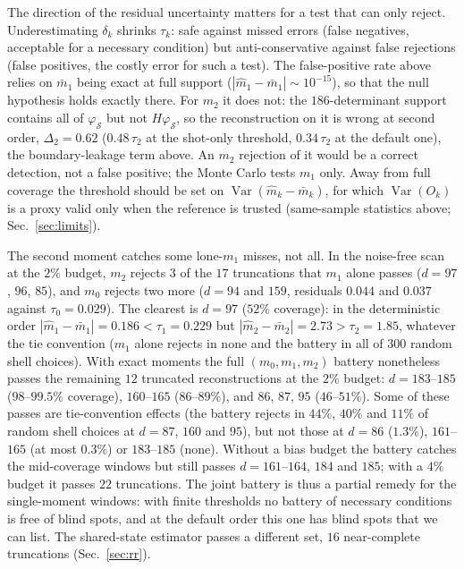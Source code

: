 \documentclass[submission, PhysCore]{SciPost}
\begin{document}
\begin{appendix}
The direction of the residual uncertainty matters for a test that can only reject. Underestimating $\delta_k$ shrinks $\tau_k$: safe against missed errors (false negatives, acceptable for a necessary condition) but anti-conservative against false rejections (false positives, the costly error for such a test). The false-positive rate above relies on $\bar m_1$ being exact at full support ($|\widehat m_1-\bar m_1|\sim10^{-15}$), so that the null hypothesis holds exactly there. For $m_2$ it does not: the $186$-determinant support contains all of $\varphi_\mathcal{S}$ but not $H\varphi_\mathcal{S}$, so the reconstruction on it is wrong at second order, $\Delta_2=0.62$ ($0.48\,\tau_2$ at the shot-only threshold, $0.34\,\tau_2$ at the default one), the boundary-leakage term above. An $m_2$ rejection of it would be a correct detection, not a false positive; the Monte Carlo tests $m_1$ only. Away from full coverage the threshold should be set on $\operatorname{Var}(\widehat m_k-\bar m_k)$, for which $\operatorname{Var}(O_k)$ is a proxy valid only when the reference is trusted (same-sample statistics above; Sec.~\ref{sec:limits}).

The second moment catches some lone-$m_1$ misses, not all. In the noise-free scan at the $2\%$ budget, $m_2$ rejects $3$ of the $17$ truncations that $m_1$ alone passes ($d=97$, $96$, $85$), and $m_0$ rejects two more ($d=94$ and $159$, residuals $0.044$ and $0.037$ against $\tau_0=0.029$). The clearest is $d=97$ ($52\%$ coverage): in the deterministic order $|\widehat m_1-\bar m_1|=0.186<\tau_1=0.229$ but $|\widehat m_2-\bar m_2|=2.73>\tau_2=1.85$, whatever the tie convention ($m_1$ alone rejects in none and the battery in all of $300$ random shell choices). With exact moments the full $(m_0,m_1,m_2)$ battery nonetheless passes the remaining $12$ truncated reconstructions at the $2\%$ budget: $d=183$--$185$ ($98$--$99.5\%$ coverage), $160$--$165$ ($86$--$89\%$), and $86$, $87$, $95$ ($46$--$51\%$). Some of these passes are tie-convention effects (the battery rejects in $44\%$, $40\%$ and $11\%$ of random shell choices at $d=87$, $160$ and $95$), but not those at $d=86$ ($1.3\%$), $161$--$165$ (at most $0.3\%$) or $183$--$185$ (none). Without a bias budget the battery catches the mid-coverage windows but still passes $d=161$--$164$, $184$ and $185$; with a $4\%$ budget it passes $22$ truncations. The joint battery is thus a partial remedy for the single-moment windows: with finite thresholds no battery of necessary conditions is free of blind spots, and at the default order this one has blind spots that we can list. The shared-state estimator passes a different set, $16$ near-complete truncations (Sec.~\ref{sec:rr}).


\end{appendix}
\end{document}
